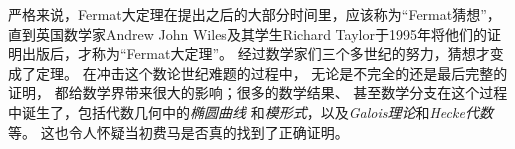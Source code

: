 \begin{shaded}
	严格来说，Fermat大定理在提出之后的大部分时间里，应该称为“Fermat猜想”，
	直到英国数学家Andrew John Wiles及其学生Richard
	Taylor于1995年将他们的证明出版后，才称为“Fermat大定理”。
	经过数学家们三个多世纪的努力，猜想才变成了定理。
	在冲击这个数论世纪难题的过程中，	无论是不完全的还是最后完整的证明，
	都给数学界带来很大的影响；很多的数学结果、
	甚至数学分支在这个过程中诞生了，包括代数几何中的{\it 椭圆曲线}
	和{\it 模形式}，以及{\it	Galois理论}和{\it Hecke代数}等。
	这也令人怀疑当初费马是否真的找到了正确证明。
	

\end{shaded}
